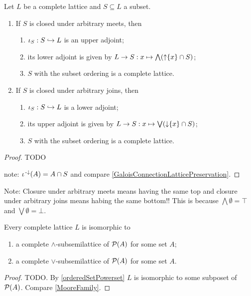 \begin{proposition} \label{completeSubsemilatticeClosure}
Let $L$ be a complete lattice and $S\subseteq L$ a subset.
\begin{enumerate}
\item If $S$ is closed under arbitrary meets, then
\begin{enumerate}
\item $\operatorname{\iota}_S: S\hookrightarrow L$ is an upper adjoint;
\item its lower adjoint is given by $L\to S: x\mapsto \bigwedge (\operatorname{\uparrow} \{x\} \cap S)$;
\item $S$ with the subset ordering is a complete lattice.
\end{enumerate}
\item If $S$ is closed under arbitrary joins, then
\begin{enumerate}
\item $\operatorname{\iota}_S: S\hookrightarrow L$ is a lower adjoint;
\item its upper adjoint is given by $L\to S: x\mapsto \bigvee (\operatorname{\downarrow} \{x\} \cap S)$;
\item $S$ with the subset ordering is a complete lattice.
\end{enumerate}
\end{enumerate}
\end{proposition}
\begin{proof}
TODO

note: $\operatorname{\iota}^{{\text{\hspace{0.15em}-}\downarrow}}(A) = A\cap S$ and compare \ref{GaloisConnectionLatticePreservation}.
\end{proof}

\begin{note}
Note:
Closure under arbitrary meets means having the same top and closure under arbitrary joins means habing the same bottom!! This is because $\bigwedge \emptyset = \top$ and $\bigvee \emptyset = \bot$.
\end{note}

\begin{proposition}
Every complete lattice $L$ is isomorphic to
\begin{enumerate}
\item a complete $\wedge$-subsemilattice of $\operatorname{\mathcal{P}}(A)$ for some set $A$;
\item a complete $\vee$-subsemilattice of $\operatorname{\mathcal{P}}(A)$ for some set $A$.
\end{enumerate}
\end{proposition}
\begin{proof}
TODO. By \ref{orderedSetPowerset} $L$ is isomorphic to some subposet of $\operatorname{\mathcal{P}}(A)$. Compare \ref{MooreFamily}.
\end{proof}

